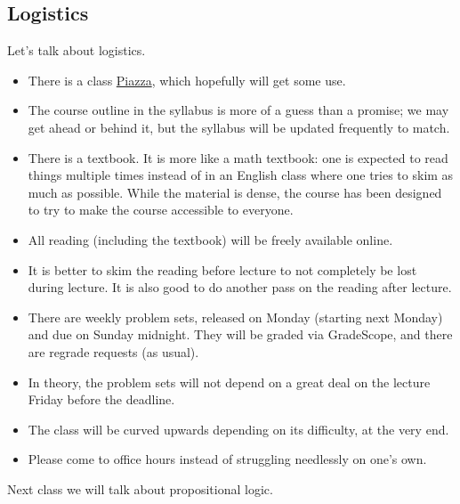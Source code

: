 \documentclass[../notes.tex]{subfiles}
\begin{document}
\subsection{Logistics}
Let's talk about logistics.
\begin{itemize}
	\item There is a class \href{https://piazza.com/class/ky91rs7rzr02bc}{Piazza}, which hopefully will get some use.
	\item The course outline in the syllabus is more of a guess than a promise; we may get ahead or behind it, but the syllabus will be updated frequently to match.
	\item There is a textbook. It is more like a math textbook: one is expected to read things multiple times instead of in an English class where one tries to skim as much as possible. While the material is dense, the course has been designed to try to make the course accessible to everyone.
	\item All reading (including the textbook) will be freely available online.
	\item It is better to skim the reading before lecture to not completely be lost during lecture. It is also good to do another pass on the reading after lecture.
	\item There are weekly problem sets, released on Monday (starting next Monday) and due on Sunday midnight. They will be graded via GradeScope, and there are regrade requests (as usual).
	\item In theory, the problem sets will not depend on a great deal on the lecture Friday before the deadline.
	\item The class will be curved upwards depending on its difficulty, at the very end.
	\item Please come to office hours instead of struggling needlessly on one's own.
\end{itemize}
Next class we will talk about propositional logic.
\end{document}
